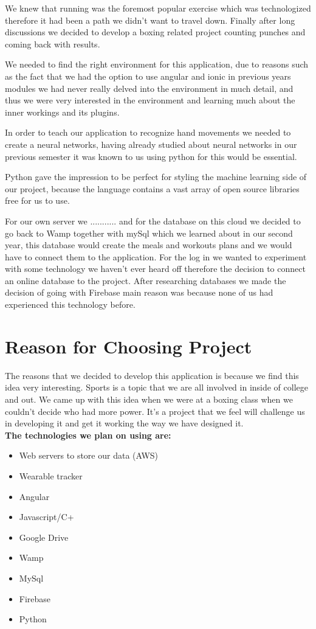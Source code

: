 \documentclass[a4paper,12pt]{report}
\begin{document}
We knew that running was the foremost popular exercise which was technologized therefore it had been a path we didn't want to travel down. Finally after long discussions we decided to develop a boxing related project counting punches and coming back with results.

We needed to find the right environment for this application, due to reasons such as the fact that we had the option to use angular and ionic in previous years modules we had never really delved into the environment in much detail, and thus we were very interested in the environment and learning much about the inner workings and its plugins.

In order to teach our application to recognize hand movements we needed to create a neural networks, having already studied about neural networks in our previous semester it was known to us using python for this would be essential.

Python gave the impression to be perfect for styling the machine learning side of
our project, because the language contains a vast array of open source libraries
free for us to use.

For our own server we ........... and for the database on this cloud we decided to go back to Wamp together with mySql which we learned about in  our second year, this database would create the meals and workouts plans and we would have to connect them to the application.
For the log in we wanted to experiment with some technology we haven't ever heard off therefore the decision to connect an online database to the project. After researching databases we made the decision of going with Firebase main reason was because none of us had experienced this technology before.

\section{Reason for Choosing Project}
The reasons that we decided to develop this application is because we find this idea very interesting. Sports is a topic that we are all involved in inside of college and out. We came up with this idea when we were at a boxing class when we couldn't decide who had more power. It’s a project that we feel will challenge us in developing it and get it working the way we have designed it.
\\
\textbf{The technologies we plan on using are:}
\begin{itemize}
\item{Web servers to store our data (AWS)}
\item{Wearable tracker}
\item{Angular}
\item{Javascript/C+}
\item{Google Drive}
\item{Wamp}
\item{MySql}
\item{Firebase}
\item{Python}
\end{itemize}
\end{document}

